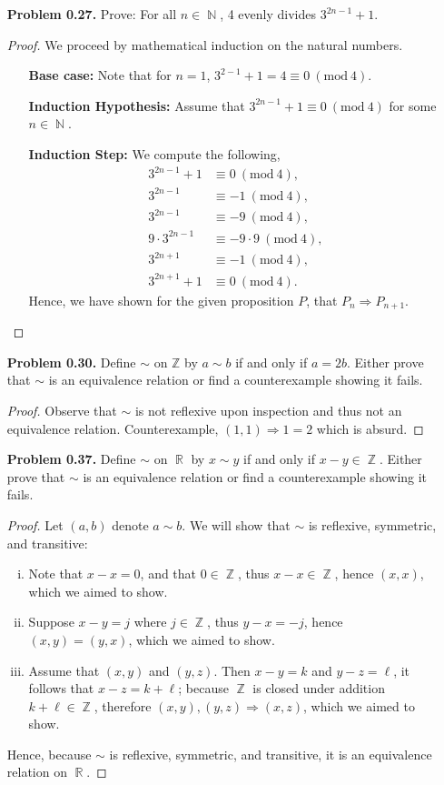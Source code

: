 \documentclass{amsart}
\renewcommand{\mod}[1]{\ (\mathrm{mod}\ #1)}
\DeclareMathOperator{\N}{\mathbb{N}}
\DeclareMathOperator{\Z}{\mathbb{Z}}
\DeclareMathOperator{\R}{\mathbb{R}}
\begin{document}
\begin{enumerate}
		\item[\textbf{Problem 0.27.}] Prove: For all $n \in \N$, 4 evenly divides $3^{2n-1} + 1$.
		\begin{proof} We proceed by mathematical induction on the natural numbers.
			\begin{enumerate}
				\item[\textbf{Base case:}] Note that for $n=1$, $3^{2-1}+1 = 4 \equiv 0 \mod{4}$.
				\item[\textbf{Induction Hypothesis:}] Assume that $3^{2n-1}+1 \equiv 0 \mod{4}$ for some $n \in \N$.
				\item[\textbf{Induction Step:}] We compute the following,
					\begin{align*}
						3^{2n-1} + 1 &\equiv 0 \mod{4}, \\
						3^{2n-1} &\equiv -1 \mod{4}, \\
						3^{2n-1} &\equiv -9 \mod{4}, \\
						9\cdot 3^{2n-1} &\equiv -9 \cdot 9 \mod{4}, \\
						3^{2n+1} &\equiv -1 \mod{4}, \\
						3^{2n+1} + 1 &\equiv 0 \mod{4}.
					\end{align*}
					Hence, we have shown for the given proposition $P$, that $P_{n} \Rightarrow P_{n+1}$.
			\end{enumerate}
		\end{proof}

		\item[\textbf{Problem 0.30.}] Define $\sim$ on $\mathbb{Z}$ by $a \sim b$ if and only if $a = 2b$. 
		Either prove that $\sim$ is an equivalence relation or find a counterexample showing it fails.
		\begin{proof} Observe that $\sim$ is not reflexive upon inspection and thus not an equivalence relation. 
		Counterexample, $(1,1) \Rightarrow 1 = 2$ which is absurd.
		\end{proof}

		\item[\textbf{Problem 0.37.}] Define $\sim$ on $\R$ by $x \sim y$ if and only if $x - y \in \Z$. 
		Either prove that $\sim$ is an equivalence relation or find a counterexample showing it fails.
		\begin{proof} Let $(a,b)$ denote $a \sim b$.
		We will show that $\sim$ is reflexive, symmetric, and transitive:
			\begin{enumerate}[(i)]
				\item Note that $x-x = 0$, and that $0 \in \Z$, thus $x-x\in\Z$, hence $(x,x)$, which we aimed to show.
				\item Suppose $x - y = j$ where $j \in \Z$, thus $y - x = -j$, hence $(x,y) = (y,x)$, which we aimed to show.
				\item Assume that $(x,y)$ and $(y,z)$. Then $x - y = k$ and $y - z = \ell$, it follows that $x - z = k + \ell$; because $\Z$ is closed under addition $k + \ell \in \Z$, therefore $(x,y),(y,z) \Rightarrow (x,z)$, which we aimed to show.
			\end{enumerate}
		Hence, because $\sim$ is reflexive, symmetric, and transitive, it is an equivalence relation on $\R$.
		\end{proof}


\end{enumerate}
\end{document}
